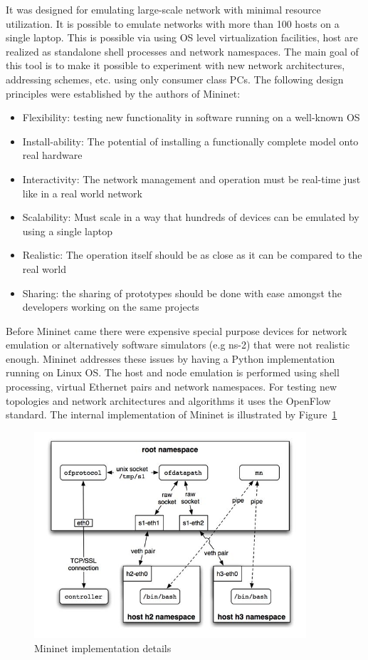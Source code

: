 \documentclass{article}
\begin{document}
It was designed for emulating large-scale network with minimal resource utilization. It is possible to emulate networks
with more than 100 hosts on a single laptop. This is possible via using OS level virtualization facilities, host are
realized as standalone shell processes and network namespaces. The main goal of this tool is to make it possible to
experiment with new network architectures, addressing schemes, etc. using only consumer class PCs. The following design
principles were established by the authors of Mininet:
\begin{itemize}
    \item Flexibility: testing new functionality in software running on a well-known OS
    \item Install-ability: The potential of installing a functionally complete model onto real hardware
    \item Interactivity: The network management and operation must be real-time just like in a real world network
    \item Scalability: Must scale in a way that hundreds of devices can be emulated by using a single laptop
    \item Realistic: The operation itself should be as close as it can be compared to the real world
    \item Sharing: the sharing of prototypes should be done with ease amongst the developers working on the same
          projects
\end{itemize}

Before Mininet came there were expensive special purpose devices for network emulation or alternatively software
simulators (e.g ns-2) that were not realistic enough. Mininet addresses these issues by having a Python implementation
running on Linux OS. The host and node emulation is performed using shell processing, virtual Ethernet pairs and
network namespaces. For testing new topologies and network architectures and algorithms it uses the OpenFlow standard.
The internal implementation of Mininet is illustrated by Figure~\ref{fig:Mininet-Impl}

\begin{figure}[!htb]
    \centering
    \includegraphics[width=0.9\textwidth]{figures/mininet_impl.png}
    \caption{Mininet implementation details}
    \label{fig:Mininet-Impl}
\end{figure}
\end{document}
